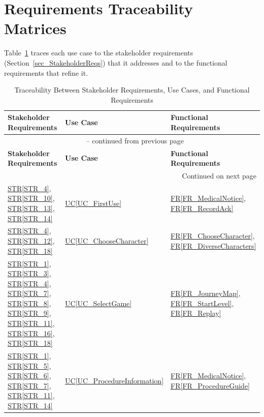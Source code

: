 \documentclass[10pt]{article}
\newcommand{\strref}[1]{\hyperref[#1]{STR\ref*{#1}}}
\newcommand{\ucref}[1]{\hyperref[#1]{UC\ref*{#1}}}
\newcommand{\rref}[1]{\hyperref[#1]{FR\ref*{#1}}}
\begin{document}
\newpage
\section{Requirements Traceability Matrices}
\label{sec_TraceMatrices}

Table~\ref{tab:SR2UC2FRtm} traces each use case to the stakeholder
requirements (Section~\ref{sec_StakeholderReqs}) that it addresses and to the
functional requirements that refine it.

\begin{longtable}{@{}p{} p{} p{}@{}}

\caption{Traceability Between Stakeholder Requirements, Use Cases, and Functional Requirements}
\label{tab:SR2UC2FRtm}\\
\toprule
\textbf{Stakeholder Requirements} & \textbf{Use Case} & \textbf{Functional Requirements} \\
\midrule
\endfirsthead

\multicolumn{3}{c}{\tablename\ \thetable{} -- continued from previous page} \\
\toprule
\textbf{Stakeholder Requirements} & \textbf{Use Case} & \textbf{Functional Requirements} \\
\midrule
\endhead

\midrule
\multicolumn{3}{r}{Continued on next page} \\
\endfoot

\bottomrule
\endlastfoot

\strref{STR_4}, \strref{STR_10}, \strref{STR_13}, \strref{STR_14}
& \ucref{UC_FirstUse} & \rref{FR_MedicalNotice}, \rref{FR_RecordAck} \\

\strref{STR_4}, \strref{STR_12}, \strref{STR_18} 
& \ucref{UC_ChooseCharacter} & \rref{FR_ChooseCharacter}, \rref{FR_DiverseCharacters} \\

\strref{STR_1}, \strref{STR_3}, \strref{STR_4}, \strref{STR_7}, \strref{STR_8}, 
\strref{STR_9}, \strref{STR_11}, \strref{STR_16}, \strref{STR_18} 
& \ucref{UC_SelectGame} & \rref{FR_JourneyMap}, \rref{FR_StartLevel}, \rref{FR_Replay} \\

\strref{STR_1}, \strref{STR_5}, \strref{STR_6}, \strref{STR_7}, \strref{STR_11}, 
\strref{STR_14} 
& \ucref{UC_ProcedureInformation} & \rref{FR_MedicalNotice}, \rref{FR_ProcedureGuide} \\


\end{longtable}
\end{document}
